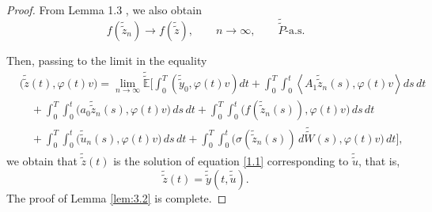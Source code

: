 \documentclass[a4paper,12pt]{article}
\numberwithin{equation}{section}
\newcommand{\wwtilde}[1]{\widetilde{\widetilde{#1}}}
\begin{document}
\begin{proof}
From Lemma 1.3 \cite{28}, we also obtain
\[
f(\wwtilde{z}_n)
\longrightarrow
f(\wwtilde{z}),
\qquad n\to\infty,
\qquad
\wwtilde{P}\text{-a.s.}
\]

Then, passing to the limit in the equality 
\[
\begin{aligned}
& \bigl(\wwtilde{z}(t),\varphi(t)v\bigr)
=
\lim_{n\to\infty}
\wwtilde{\mathbb{E}}
\Bigg[
\int_0^T
\left(
\wwtilde{y}_0,\varphi(t)v
\right) dt +
\int_0^T\int_0^t
\left\langle
A_1\wwtilde{z}_n(s),\varphi(t)v
\right\rangle ds\,dt
\\
&\quad+
\int_0^T\int_0^t
\bigl(
a_0\wwtilde{z}_n(s),\varphi(t)v
\bigr)\,ds\,dt +
\int_0^T\int_0^t
\bigl(
f(\wwtilde{z}_n(s)),\varphi(t)v
\bigr)\,ds\,dt
\\
&\quad+
\int_0^T\int_0^t
\bigl(
\wwtilde{u}_n(s),\varphi(t)v
\bigr)\,ds\,dt +
\int_0^T\int_0^t
\bigl(
\sigma(\wwtilde{z}_n(s))\,d\wwtilde{W}(s),
\varphi(t)v
\bigr)\,dt
\Bigg],
\end{aligned}
\]
we obtain that $\wwtilde{z}(t)$ is the solution of equation
\eqref{1.1} corresponding to $\wwtilde{u}$, that is,
\[
\wwtilde{z}(t)
=
\wwtilde{y}(t,\wwtilde{u}).
\]
The proof of Lemma \ref{lem:3.2} is complete.
\end{proof}
\end{document}
